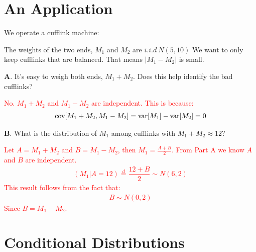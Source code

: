 \documentclass[../../../Master/AppliedStochastics.tex]{subfiles}
\author{Chandler}  %
\date{October 3}    %
\begin{document}
%


\makelecture %

\section{An Application}

We operate a cufflink machine:

\begin{center}
\end{center}

The weights of the two ends, $M_1$ and $M_2$ are $i.i.d\ N(5,10)$ 
We want to only keep cufflinks that are balanced. 
That means $\lvert M_{1} - M_{2} \rvert$ is small.

\textbf{A}. It's easy to weigh both ends, $M_{1}+M_{2}$. 
Does this help identify the bad cufflinks?

\textcolor{Red}{No. $M_{1}+M_{2}$ and $M_{1}-M_{2}$ are independent. 
	This is because: 
	$$\begin{aligned}
	\operatorname{cov} [M_{1}+M_{2}, M_{1}-M_{2}] = \operatorname{var} [M_{1}]-\operatorname{var} [M_{2}] = 0
	\end{aligned}$$ }

\textbf{B}. What is the distribution of $M_{1}$ among cufflinks with $M_{1}+M_{2}\approx 12$? 

\textcolor{Red}{Let $A=M_{1}+M_{2}$ and $B=M_{1}-M_{2}$, then $M_{1}=\frac{A+B}{2}$. 
	From Part A we know $A$ and $B$ are independent. 
	$$\begin{aligned}
	(M_{1}\vert A=12) \stackrel{d}{=} \dfrac{12 + B}{2} \sim N(6,2)
	\end{aligned}$$
	This result follows from the fact that: 
	$$\begin{aligned}
	B \sim N(0,2)
	\end{aligned}$$ 
	Since $B=M_{1}-M_{2}$.
}


\section{Conditional Distributions}
\end{document}

